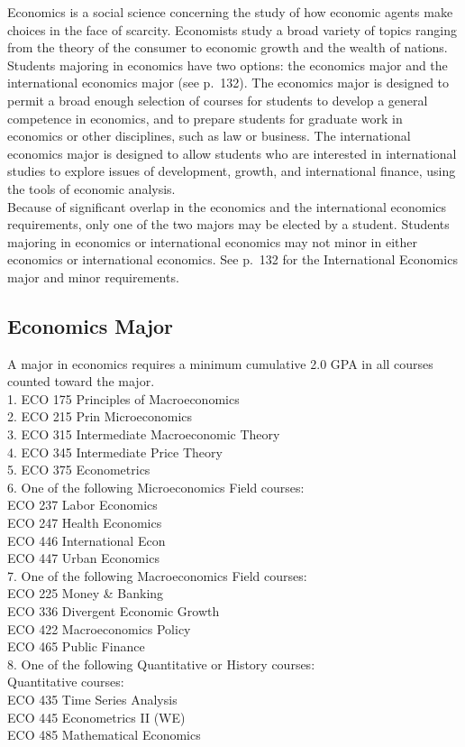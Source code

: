 \documentclass[
  letterpaper,
]{scrbook}
\begin{document}
Economics is a social science concerning the study of how economic
agents make choices in the face of scarcity. Economists study a broad
variety of topics ranging from the theory of the consumer to economic
growth and the wealth of nations. Students majoring in economics have
two options: the economics major and the international economics major
(see p.~132). The economics major is designed to permit a broad enough
selection of courses for students to develop a general competence in
economics, and to prepare students for graduate work in economics or
other disciplines, such as law or business. The international economics
major is designed to allow students who are interested in international
studies to explore issues of development, growth, and international
finance, using the tools of economic analysis.\\
Because of significant overlap in the economics and the international
economics requirements, only one of the two majors may be elected by a
student. Students majoring in economics or international economics may
not minor in either economics or international economics. See p.~132 for
the International Economics major and minor requirements.

\subsection{Economics Major}\label{economics-major}

A major in economics requires a minimum cumulative 2.0 GPA in all
courses counted toward the major.\\
1. ECO 175 Principles of Macroeconomics\\
2. ECO 215 Prin Microeconomics\\
3. ECO 315 Intermediate Macroeconomic Theory\\
4. ECO 345 Intermediate Price Theory\\
5. ECO 375 Econometrics\\
6. One of the following Microeconomics Field courses:\\
ECO 237 Labor Economics\\
ECO 247 Health Economics\\
ECO 446 International Econ\\
ECO 447 Urban Economics\\
7. One of the following Macroeconomics Field courses:\\
ECO 225 Money \& Banking\\
ECO 336 Divergent Economic Growth\\
ECO 422 Macroeconomics Policy\\
ECO 465 Public Finance\\
8. One of the following Quantitative or History courses:\\
Quantitative courses:\\
ECO 435 Time Series Analysis\\
ECO 445 Econometrics II (WE)\\
ECO 485 Mathematical Economics
\end{document}
